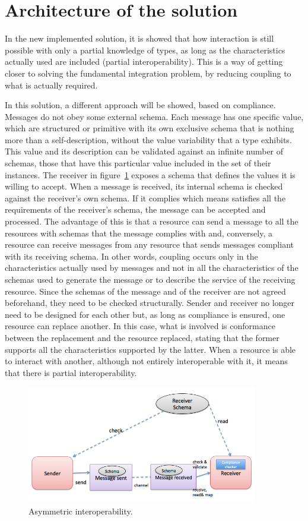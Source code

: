 \documentclass[runningheads,a4paper]{llncs}
\begin{document}
\section{Architecture of the solution}
In the new implemented solution, it is showed that how interaction is still possible with only a partial knowledge of types, as long as the characteristics actually used are included (partial interoperability). This is a way of getting closer to solving the fundamental integration problem, by reducing coupling to what is actually required.

In this solution, a different approach will be showed, based on compliance. Messages do not obey some external schema. Each message has one specific value, which are structured or primitive with its own exclusive schema that is nothing more than a self-description, without the value variability that a type exhibits. This value and its description can be validated against an infinite number of schemas, those that have this particular value included in the set of their instances.
The receiver in figure~\ref{fig:Asymmetric} exposes a schema that defines the values it is willing to accept. When a message is received, its internal schema is checked against the receiver’s own schema. If it complies which means satisfies all the requirements of the receiver’s schema, the message can be accepted and processed. The advantage of this is that a resource can send a message to all the resources with schemas that the message complies with and, conversely, a resource can receive messages from any resource that sends messages compliant with its receiving schema. In other words, coupling occurs only in the characteristics actually used by messages and not in all the characteristics of the schemas used to generate the message or to describe the service of the receiving resource. Since the schemas of the message and of the receiver are not agreed beforehand, they need to be checked structurally. Sender and receiver no longer need to be designed for each other but, as long as compliance is ensured, one resource can replace another. In this case, what is involved is conformance between the replacement and the resource replaced, stating that the former supports all the characteristics supported by the latter. When a resource is able to interact with another, although not entirely interoperable with it, it means that there is partial interoperability.
\begin{figure}[!htb]
 \centering
 \includegraphics[width=0.9\textwidth]{Figures/asyc.png}
 \caption[Asymmetric interoperability.]{Asymmetric interoperability.}
 \label{fig:Asymmetric}
\end{figure}
\end{document}
